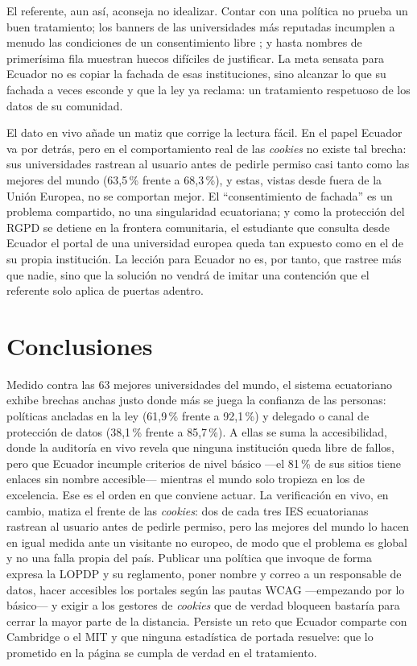 \documentclass[11pt,a4paper]{article}
\begin{document}
El referente, aun así, aconseja no idealizar. Contar con una política no prueba un buen tratamiento; los banners de las universidades más reputadas incumplen a menudo las condiciones de un consentimiento libre \citep{nouwens2020dark,gray2021dark}; y hasta nombres de primerísima fila muestran huecos difíciles de justificar. La meta sensata para Ecuador no es copiar la fachada de esas instituciones, sino alcanzar lo que su fachada a veces esconde y que la ley ya reclama: un tratamiento respetuoso de los datos de su comunidad.

El dato en vivo añade un matiz que corrige la lectura fácil. En el papel Ecuador va por detrás, pero en el comportamiento real de las \emph{cookies} no existe tal brecha: sus universidades rastrean al usuario antes de pedirle permiso casi tanto como las mejores del mundo (63,5\,\% frente a 68,3\,\%), y estas, vistas desde fuera de la Unión Europea, no se comportan mejor. El ``consentimiento de fachada'' es un problema compartido, no una singularidad ecuatoriana; y como la protección del RGPD se detiene en la frontera comunitaria, el estudiante que consulta desde Ecuador el portal de una universidad europea queda tan expuesto como en el de su propia institución. La lección para Ecuador no es, por tanto, que rastree más que nadie, sino que la solución no vendrá de imitar una contención que el referente solo aplica de puertas adentro.

\section{Conclusiones}\label{sec:conclusiones}
Medido contra las 63 mejores universidades del mundo, el sistema ecuatoriano exhibe brechas anchas justo donde más se juega la confianza de las personas: políticas ancladas en la ley (61,9\,\% frente a 92,1\,\%) y delegado o canal de protección de datos (38,1\,\% frente a 85,7\,\%). A ellas se suma la accesibilidad, donde la auditoría en vivo revela que ninguna institución queda libre de fallos, pero que Ecuador incumple criterios de nivel básico ---el 81\,\% de sus sitios tiene enlaces sin nombre accesible--- mientras el mundo solo tropieza en los de excelencia. Ese es el orden en que conviene actuar. La verificación en vivo, en cambio, matiza el frente de las \emph{cookies}: dos de cada tres IES ecuatorianas rastrean al usuario antes de pedirle permiso, pero las mejores del mundo lo hacen en igual medida ante un visitante no europeo, de modo que el problema es global y no una falla propia del país. Publicar una política que invoque de forma expresa la LOPDP y su reglamento, poner nombre y correo a un responsable de datos, hacer accesibles los portales según las pautas WCAG \citep{wcag21} ---empezando por lo básico--- y exigir a los gestores de \emph{cookies} que de verdad bloqueen bastaría para cerrar la mayor parte de la distancia. Persiste un reto que Ecuador comparte con Cambridge o el MIT y que ninguna estadística de portada resuelve: que lo prometido en la página se cumpla de verdad en el tratamiento.
\end{document}
